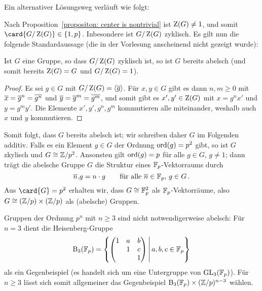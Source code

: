 \begin{remark}
  Ein alternativer Lösungsweg verläuft wie folgt:
  
  Nach Proposition~\ref{propositon: center is nontrivial} ist $\operatorname{Z}(G) \neq 1$, und somit $\card{ G / \groupcenter{G} } \in \{1, p\}$.
  Inbesondere ist $G / \operatorname{Z}(G)$ zyklisch.
  Es gilt nun die folgende Standardaussage (die in der Vorlesung anscheinend nicht gezeigt wurde):
  
  \begin{lemma}
    Ist $G$ eine Gruppe, so dass $G/\operatorname{Z}(G)$ zyklisch ist, so ist $G$ bereits abelsch \textup(und somit bereits $\operatorname{Z}(G) = G$ und $G/\operatorname{Z}(G) = 1$\textup).
  \end{lemma}
  
  \begin{proof}
    Es sei $g \in G$ mit $G/\operatorname{Z}(G) = \langle \overline{g} \rangle$.
    Für $x, y \in G$ gibt es dann $n, m \geq 0$ mit $\overline{x} = \overline{g}^n = \overline{g^n}$ und $\overline{y} = \overline{g}^m = \overline{g^m}$, und somit gibt es $x', y' \in \operatorname{Z}(G)$ mit $x = g^n x'$ und $y = g^m y'$.
    Die Elemente $x', y', g^n, g^m$ kommutieren alle miteinander, weshalb auch $x$ und $y$ kommutieren.
  \end{proof}
  
  Somit folgt, dass $G$ bereits abelsch ist;
  wir schreiben daher $G$ im Folgenden additiv.
  Falls es ein Element $g \in G$ der Ordnung $\operatorname{ord}(g) = p^2$ gibt, so ist $G$ zkylisch und $G \cong \mathbb{Z}/p^2$.
  Ansonsten gilt $\operatorname{ord}(g) = p$ für alle $g \in G$, $g \neq 1$;
  dann trägt die abelsche Gruppe $G$ die Struktur eines $\mathbb{F}_{p}$-Vektorraums durch
  \[
      \overline{n}.g
    = n \cdot g
    \qquad
    \text{für alle $\overline{n} \in \mathbb{F}_{p}$, $g \in G$}\,.
  \]
  Aus $\card{G} = p^2$ erhalten wir, dass $G \cong \mathbb{F}_{p}^2$ als $\mathbb{F}_{p}$-Vektorräume, also $G \cong (\mathbb{Z}/p) \times (\mathbb{Z}/p)$ als (abelsche) Gruppen.
\end{remark}

\begin{remark}
  Gruppen der Ordnung $p^n$ mit $n \geq 3$ sind nicht notwendigerweise abelsch:
  Für $n = 3$ dient die Heisenberg-Gruppe
  \[
      \Borel{3}{\Finite{p}}
    = \left\{
        \begin{pmatrix}
          1 & a & b \\
            & 1 & c \\
            &   & 1
        \end{pmatrix}
        \suchthat*
        a, b, c \in \Finite{p}
      \right\}
  \]
  als ein Gegenbeispiel (es handelt sich um eine Untergruppe von $\operatorname{GL}_{3}(\mathbb{F}_{p})$).
  Für $n \geq 3$ lässt sich somit allgemeiner das Gegenbeispiel $\operatorname{B}_{3}(\mathbb{F}_{p}) \times (\mathbb{Z}/p)^{n-3}$ wählen.
\end{remark}

